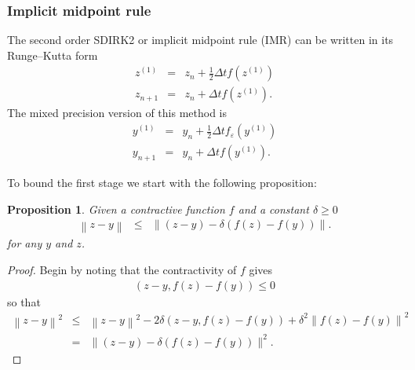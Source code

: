 \documentclass{siamart251104}
\newtheorem{prop}{Proposition}
\newcommand{\dt}{\Delta t}
\begin{document}
\subsubsection{Implicit midpoint rule}
The second order  SDIRK2 or implicit midpoint rule (IMR)  
can be written in its  Runge--Kutta form
\begin{subequations} \label{IMR}
\begin{eqnarray} 
z^{(1)} & = & z_n + \frac{1}{2} \dt f(z^{(1)})   \\ 
z_{n+1} & = & z_n + \dt f(z^{(1)}) .
\end{eqnarray}
\end{subequations}
The mixed precision version of this method is 
\begin{subequations} \label{MPIMR}
\begin{eqnarray} 
y^{(1)} & = & y_n + \frac{1}{2} \dt f_\varepsilon (y^{(1)})   \\ 
y_{n+1} & = & y_n + \dt f(y^{(1)}) .
\end{eqnarray}
\end{subequations}

To bound the first stage we start with the following proposition:


\begin{prop} \label{prop1}
Given a contractive function $f$ and a constant $\delta \geq 0 $
\begin{eqnarray} \label{ImplicitStageBound}
\left\|z - y \right\|
& \leq &
\left\|(z - y)   - \delta  \left(f(z) -  f(y)  \right) \right\|. 
\end{eqnarray}
for any   $y$ and $z$. 
\end{prop}
\begin{proof}
Begin by noting that the contractivity of $f$ gives
\begin{eqnarray*}
    \left(z - y, f(z) -  f(y) \right) \leq 0 
\end{eqnarray*}  
so that
\begin{eqnarray*} 
\left\|z - y \right\|^2
& \leq &
\left\|z - y \right\|^2  
- 2 \delta   \left(z - y, f(z) -  f(y) \right)  + 
\delta^2 \left\|f(z) - f(y) \right\|^2 \\
& = & \| (z - y)  - \delta \left( f(z) - f(y)\right) \|^2.
\end{eqnarray*}

\end{proof}
\end{document}
